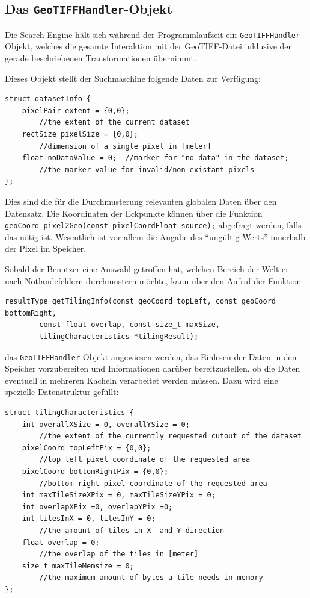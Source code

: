 \documentclass[10pt,a4paper]{report}
\begin{document}
\subsection{Das \texttt{GeoTIFFHandler}-Objekt}

Die Search Engine hält sich während der Programmlaufzeit ein \texttt{GeoTIFFHandler}-Objekt, welches die gesamte Interaktion mit der GeoTIFF-Datei inklusive der gerade beschriebenen Transformationen übernimmt.

Dieses Objekt stellt der Suchmaschine folgende Daten zur Verfügung:

\begin{lstlisting}[language=myC]
struct datasetInfo {
	pixelPair extent = {0,0};	
		//the extent of the current dataset
	rectSize pixelSize = {0,0}; 	
		//dimension of a single pixel in [meter]
	float noDataValue = 0;	//marker for "no data" in the dataset;
		//the marker value for invalid/non existant pixels
};	
\end{lstlisting}

Dies sind die für die Durchmusterung relevanten globalen Daten über den Datensatz. Die Koordinaten der Eckpunkte können über die Funktion \\
\verb|geoCoord pixel2Geo(const pixelCoordFloat source);| abgefragt werden, falls das nötig ist. Wesentlich ist vor allem die Angabe des "`ungültig Werts"' innerhalb der Pixel im Speicher.

Sobald der Benutzer eine Auswahl getroffen hat, welchen Bereich der Welt er nach Notlandefeldern durchmustern möchte, kann über den Aufruf der Funktion 
\begin{lstlisting}[language=myC]
resultType getTilingInfo(const geoCoord topLeft, const geoCoord bottomRight,
		const float overlap, const size_t maxSize, 
		tilingCharacteristics *tilingResult);
\end{lstlisting}

das \texttt{GeoTIFFHandler}-Objekt angewiesen werden, das Einlesen der Daten in den Speicher vorzubereiten und Informationen darüber bereitzustellen, ob die Daten eventuell in mehreren Kacheln verarbeitet werden müssen. Dazu wird eine spezielle Datenstruktur gefüllt:
\begin{lstlisting}[language=myC]
struct tilingCharacteristics {
	int overallXSize = 0, overallYSize = 0;	
		//the extent of the currently requested cutout of the dataset
	pixelCoord topLeftPix = {0,0};	
		//top left pixel coordinate of the requested area
	pixelCoord bottomRightPix = {0,0};	
		//bottom right pixel coordinate of the requested area
	int maxTileSizeXPix = 0, maxTileSizeYPix = 0;
	int overlapXPix =0, overlapYPix =0;
	int tilesInX = 0, tilesInY = 0;	
		//the amount of tiles in X- and Y-direction
	float overlap = 0;	
		//the overlap of the tiles in [meter]
	size_t maxTileMemsize = 0;	
		//the maximum amount of bytes a tile needs in memory
};
\end{lstlisting}
\end{document}

